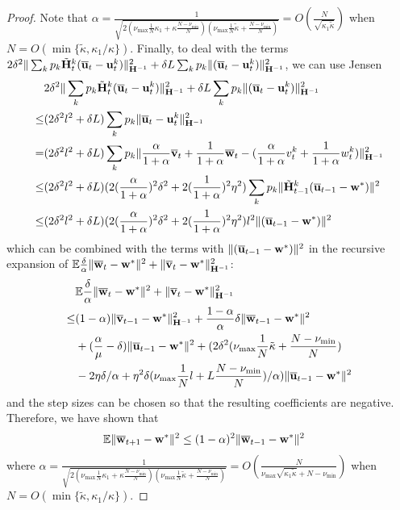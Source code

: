 \begin{proof}
	Note that $\alpha=\frac{1}{\sqrt{2(\nu_{\max}\frac{1}{N}\kappa_{1}+\kappa\frac{N-\nu_{\min}}{N})(\nu_{\max}\frac{1}{N}\tilde{\kappa}+\frac{N-\nu_{\min}}{N})}}=O(\frac{N}{\sqrt{\kappa_{1}\tilde{\kappa}}})$
	when $N=O(\min\{\tilde{\kappa},\kappa_{1}/\kappa\})$. Finally, to
	deal with the terms $2\delta^{2}\|\sum_{k}p_{k}\tilde{{\mathbf{H}}}_{t}^{k}({\overline{\mathbf{u}}}_{t}-{\mathbf{u}}_{t}^{k})\|_{{\mathbf{H}}^{-1}}^{2}+\delta L\sum_{k}p_{k}\|({\overline{\mathbf{u}}}_{t}-{\mathbf{u}}_{t}^{k})\|_{{\mathbf{H}}^{-1}}^{2}$,
	we can use Jensen
	{\scriptsize
	\begin{align*}
	&2\delta^{2}\|\sum_{k}p_{k}\tilde{{\mathbf{H}}}_{t}^{k}({\overline{\mathbf{u}}}_{t}-{\mathbf{u}}_{t}^{k})\|_{{\mathbf{H}}^{-1}}^{2}+\delta L\sum_{k}p_{k}\|({\overline{\mathbf{u}}}_{t}-{\mathbf{u}}_{t}^{k})\|_{{\mathbf{H}}^{-1}}^{2} \\
   \leq & (2\delta^{2}l^{2}+\delta L)\sum_{k}p_{k}\|{\overline{\mathbf{u}}}_{t}-{\mathbf{u}}_{t}^{k}\|_{{\mathbf{H}}^{-1}}^{2}\\
	= &(2\delta^{2}l^{2}+\delta L)\sum_{k}p_{k}\|\frac{\alpha}{1+\alpha}{\overline{\mathbf{v}}}_{t}+\frac{1}{1+\alpha}{\overline{\mathbf{w}}}_{t}-(\frac{\alpha}{1+\alpha}v_{t}^{k}+\frac{1}{1+\alpha}w_{t}^{k})\|_{{\mathbf{H}}^{-1}}^{2}\\
	\leq &(2\delta^{2}l^{2}+\delta L)(2(\frac{\alpha}{1+\alpha})^{2}\delta^{2}+2(\frac{1}{1+\alpha})^{2}\eta^{2})\sum_{k}p_{k}\|\tilde{{\mathbf{H}}}_{t-1}^{k}({\overline{\mathbf{u}}}_{t-1}-{\mathbf{w}}^{\ast})\|^{2}\\
	\leq &(2\delta^{2}l^{2}+\delta L)(2(\frac{\alpha}{1+\alpha})^{2}\delta^{2}+2(\frac{1}{1+\alpha})^{2}\eta^{2})l^{2}\|({\overline{\mathbf{u}}}_{t-1}-{\mathbf{w}}^{\ast})\|^{2}
	\end{align*}
	}
	which can be combined with the terms with $\|({\overline{\mathbf{u}}}_{t-1}-{\mathbf{w}}^{\ast})\|^{2}$
	in the recursive expansion of $\mathbb{E}\frac{\delta}{\alpha}\|{\overline{\mathbf{w}}}_{t}-{\mathbf{w}}^{\ast}\|^{2}+\|{\overline{\mathbf{v}}}_{t}-{\mathbf{w}}^{\ast}\|_{{\mathbf{H}}^{-1}}^{2}$:
	\begin{align*}
	& \mathbb{E}\frac{\delta}{\alpha}\|{\overline{\mathbf{w}}}_{t}-{\mathbf{w}}^{\ast}\|^{2}+\|{\overline{\mathbf{v}}}_{t}-{\mathbf{w}}^{\ast}\|_{{\mathbf{H}}^{-1}}^{2}\\
	\leq &(1-\alpha)\|{\overline{\mathbf{v}}}_{t-1}-{\mathbf{w}}^{\ast}\|_{{\mathbf{H}}^{-1}}^{2}+\frac{1-\alpha}{\alpha}\delta\|{\overline{\mathbf{w}}}_{t-1}-{\mathbf{w}}^{\ast}\|^{2}\\
	&+(\frac{\alpha}{\mu}-\delta)\|{\overline{\mathbf{u}}}_{t-1}-{\mathbf{w}}^{\ast}\|^{2}+(2\delta^{2}(\nu_{\max}\frac{1}{N}\tilde{\kappa}+\frac{N-\nu_{\min}}{N})\\
	&-2\eta\delta/\alpha+\eta^{2}\delta(\nu_{\max}\frac{1}{N}l+L\frac{N-\nu_{\min}}{N})/\alpha)\|{\overline{\mathbf{u}}}_{t-1}-{\mathbf{w}}^{\ast}\|^{2}
	\end{align*}
	and the step sizes can be chosen so that the resulting coefficients
	are negative. Therefore, we have shown that 
	\begin{align*}
	\mathbb{E}\|{\overline{\mathbf{w}}}_{t+1}-{\mathbf{w}}^{\ast}\|^{2} & \leq(1-\alpha)^{2}\|{\overline{\mathbf{w}}}_{t-1}-{\mathbf{w}}^{\ast}\|^{2}
	\end{align*}
	where $\alpha=\frac{1}{\sqrt{2(\nu_{\max}\frac{1}{N}\kappa_{1}+\kappa\frac{N-\nu_{\min}}{N})(\nu_{\max}\frac{1}{N}\tilde{\kappa}+\frac{N-\nu_{\min}}{N})}}=O(\frac{N}{\nu_{\max}\sqrt{\kappa_{1}\tilde{\kappa}}+N-\nu_{\min}})$
	when $N=O(\min\{\tilde{\kappa},\kappa_{1}/\kappa\})$.
	

\end{proof}
